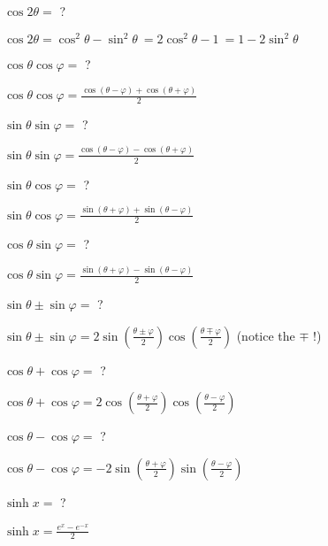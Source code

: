 \documentclass[12pt]{article}
\newcommand*{\xfield}[1]{\begin{mdframed}\centering #1\end{mdframed}\bigskip}
\newenvironment{note}{}{}
\begin{document}
\begin{note}
    \xfield{$\cos 2\theta =$ ?}
    \xfield{$\cos 2\theta = \cos^2 \theta - \sin^2 \theta \ = 2 \cos^2 \theta - 1\ = 1 - 2 \sin^2 \theta$}
\end{note}

\begin{note}
    \xfield{$\cos \theta \cos \varphi =$ ?}
    \xfield{$\cos \theta \cos \varphi = \frac{\cos(\theta - \varphi) + \cos(\theta + \varphi)} {2}$}
\end{note}

\begin{note}
    \xfield{$\sin \theta \sin \varphi =$ ?}
    \xfield{$\sin \theta \sin \varphi = \frac{\cos(\theta - \varphi) - \cos(\theta + \varphi)} {2}$}
\end{note}

\begin{note}
    \xfield{$\sin \theta \cos \varphi =$ ?}
    \xfield{$\sin \theta \cos \varphi = \frac{\sin(\theta + \varphi) + \sin(\theta - \varphi)} {2}$}
\end{note}

\begin{note}
    \xfield{$\cos \theta \sin \varphi =$ ?}
    \xfield{$\cos \theta \sin \varphi = \frac{\sin(\theta + \varphi) - \sin(\theta - \varphi)} {2}$}
\end{note}

\begin{note}
    \xfield{$\sin \theta \pm \sin \varphi =$ ?}
    \xfield{$\sin \theta \pm \sin \varphi = 2 \sin\left( \frac{\theta \pm \varphi}{2} \right) \cos\left( \frac{\theta \mp \varphi}{2} \right)$ (notice the $\mp$ !)}
\end{note}

\begin{note}
    \xfield{$\cos \theta + \cos \varphi =$ ?}
    \xfield{$\cos \theta + \cos \varphi = 2 \cos\left( \frac{\theta + \varphi} {2} \right) \cos\left( \frac{\theta - \varphi}{2} \right)$}
\end{note}

\begin{note}
    \xfield{$\cos \theta - \cos \varphi =$ ?}
    \xfield{$\cos \theta - \cos \varphi = -2\sin\left( \frac{\theta + \varphi} {2}\right) \sin\left(\frac {\theta - \varphi}{2}\right)$}
\end{note}

\begin{note}
    \xfield{$\sinh x =$ ?}
    \xfield{$\sinh x = \frac {e^x - e^{-x}} {2}$}
\end{note}
\end{document}
